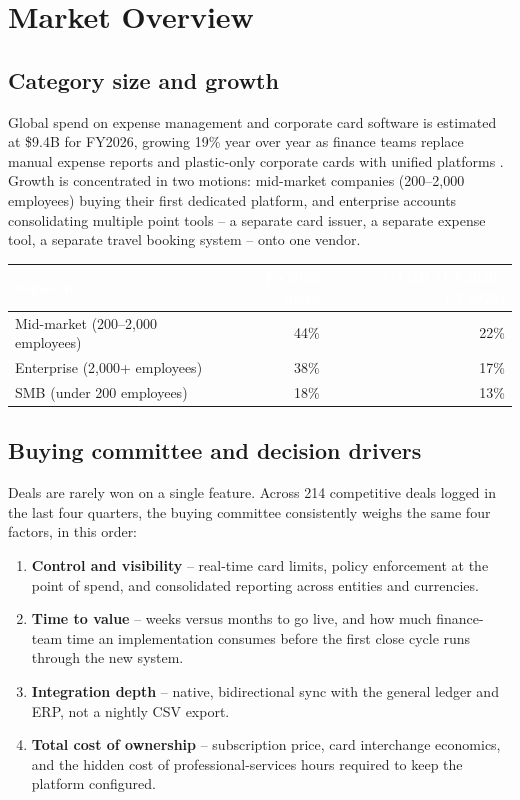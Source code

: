 \section{Market Overview}

\subsection{Category size and growth}

Global spend on expense management and corporate card software is estimated at \$9.4B for
FY2026, growing 19\% year over year as finance teams replace manual expense reports and
plastic-only corporate cards with unified platforms \cite{cedarpoint2026sizing}. Growth is
concentrated in two motions: mid-market companies (200--2,000 employees) buying their first
dedicated platform, and enterprise accounts consolidating multiple point tools -- a separate
card issuer, a separate expense tool, a separate travel booking system -- onto one vendor.

\begin{center}
\footnotesize
\begin{tabularx}{\linewidth}{@{}Y r r@{}}
\toprule
{}
\textcolor{white}{\textbf{Segment}} & \textcolor{white}{\textbf{FY2026 share}} & \textcolor{white}{\textbf{CAGR (FY2026--FY2029)}} \\
\midrule
Mid-market (200--2,000 employees) & 44\% & 22\% \\
Enterprise (2,000+ employees) & 38\% & 17\% \\
SMB (under 200 employees) & 18\% & 13\% \\
\bottomrule
\end{tabularx}
\end{center}

\subsection{Buying committee and decision drivers}

Deals are rarely won on a single feature. Across 214 competitive deals logged in the last four
quarters, the buying committee consistently weighs the same four factors, in this order:

\begin{enumerate}[leftmargin=1.4em, itemsep=2pt]
  \item \textbf{Control and visibility} -- real-time card limits, policy enforcement at the
    point of spend, and consolidated reporting across entities and currencies.
  \item \textbf{Time to value} -- weeks versus months to go live, and how much finance-team
    time an implementation consumes before the first close cycle runs through the new system.
  \item \textbf{Integration depth} -- native, bidirectional sync with the general ledger and
    ERP, not a nightly CSV export.
  \item \textbf{Total cost of ownership} -- subscription price, card interchange economics, and
    the hidden cost of professional-services hours required to keep the platform configured.
\end{enumerate}

